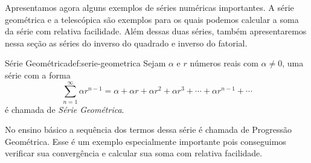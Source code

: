 Apresentamos agora alguns exemplos de séries numéricas importantes.
A série geométrica e a telescópica são exemplos para os quais podemos calcular
a soma da série com relativa facilidade.
Além dessas duas séries, também apresentaremos nessa seção as
séries do inverso do quadrado e inverso do fatorial.

\begin{definicao}{Série Geométrica}{def:serie-geometrica}
  Sejam $\alpha$ e $r$ números reais com $\alpha\neq 0$, uma série com a forma
  \[
    \sum_{n=1}^\infty \alpha r^{n-1} =
    \alpha + \alpha r + \alpha r^2 + \alpha r^3 + \cdots + \alpha r^{n-1} + \cdots
  \]
  é chamada de \emph{Série Geométrica}.
\end{definicao}

No ensino básico a sequência dos termos dessa série é chamada de
Progressão Geométrica.
Esse é um exemplo especialmente importante pois conseguimos verificar sua convergência
e calcular sua soma com relativa facilidade.

